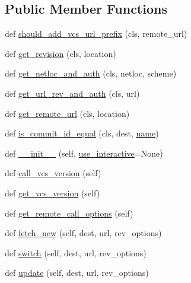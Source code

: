 \subsection*{Public Member Functions}
\begin{DoxyCompactItemize}
\item 
def \hyperlink{classpip_1_1__internal_1_1vcs_1_1subversion_1_1Subversion_ae992724c3cab0929cc58be8245846500}{should\+\_\+add\+\_\+vcs\+\_\+url\+\_\+prefix} (cls, remote\+\_\+url)
\item 
def \hyperlink{classpip_1_1__internal_1_1vcs_1_1subversion_1_1Subversion_a2c71f0bcdbd6eee7beb8f5f1709faeb1}{get\+\_\+revision} (cls, location)
\item 
def \hyperlink{classpip_1_1__internal_1_1vcs_1_1subversion_1_1Subversion_a6e56e5234ab6238441b73cb21d1583cb}{get\+\_\+netloc\+\_\+and\+\_\+auth} (cls, netloc, scheme)
\item 
def \hyperlink{classpip_1_1__internal_1_1vcs_1_1subversion_1_1Subversion_aa5b11581deeb81886e9cd1f81a44ecb6}{get\+\_\+url\+\_\+rev\+\_\+and\+\_\+auth} (cls, url)
\item 
def \hyperlink{classpip_1_1__internal_1_1vcs_1_1subversion_1_1Subversion_afdb927f50e790e769ca5f5db12dbdbd6}{get\+\_\+remote\+\_\+url} (cls, location)
\item 
def \hyperlink{classpip_1_1__internal_1_1vcs_1_1subversion_1_1Subversion_a6a4f6aaa4a5bf9fc2de0a550cbd2d320}{is\+\_\+commit\+\_\+id\+\_\+equal} (cls, dest, \hyperlink{classpip_1_1__internal_1_1vcs_1_1subversion_1_1Subversion_a91f38ef2ac2532faf91866a31e67a782}{name})
\item 
def \hyperlink{classpip_1_1__internal_1_1vcs_1_1subversion_1_1Subversion_abc67960376600c626c554f413d1634cf}{\+\_\+\+\_\+init\+\_\+\+\_\+} (self, \hyperlink{classpip_1_1__internal_1_1vcs_1_1subversion_1_1Subversion_a6d2f25fce53da7b67e8214fabaacfb02}{use\+\_\+interactive}=None)
\item 
def \hyperlink{classpip_1_1__internal_1_1vcs_1_1subversion_1_1Subversion_a28eb0ea686f7fdfb26b3672e0d936be5}{call\+\_\+vcs\+\_\+version} (self)
\item 
def \hyperlink{classpip_1_1__internal_1_1vcs_1_1subversion_1_1Subversion_a07d700bdb9e85e2709ecedc54344a0b8}{get\+\_\+vcs\+\_\+version} (self)
\item 
def \hyperlink{classpip_1_1__internal_1_1vcs_1_1subversion_1_1Subversion_a894ac76a60631cd377d58eec97f92772}{get\+\_\+remote\+\_\+call\+\_\+options} (self)
\item 
def \hyperlink{classpip_1_1__internal_1_1vcs_1_1subversion_1_1Subversion_a994fcc3f75133b0a74c8774b242069bb}{fetch\+\_\+new} (self, dest, url, rev\+\_\+options)
\item 
def \hyperlink{classpip_1_1__internal_1_1vcs_1_1subversion_1_1Subversion_a0bdef65fc1bef9f97871c1911ed12faf}{switch} (self, dest, url, rev\+\_\+options)
\item 
def \hyperlink{classpip_1_1__internal_1_1vcs_1_1subversion_1_1Subversion_af9efc6f286384fb3f4791c4c23a1633c}{update} (self, dest, url, rev\+\_\+options)
\end{DoxyCompactItemize}
